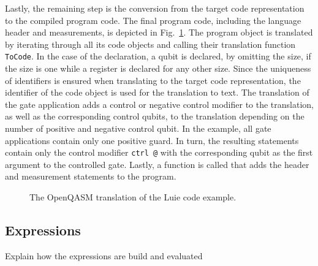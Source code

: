 Lastly, the remaining step is the conversion from the target code representation to the compiled program code. The final program code, including the language header and measurements, is depicted in Fig.~\ref{fig:codeGen_target_example}. The program object is translated by iterating through all its code objects and calling their translation function \texttt{ToCode}. In the case of the declaration, a qubit is declared, by omitting the size, if the size is one while a register is declared for any other size. Since the uniqueness of identifiers is ensured when translating to the target code representation, the identifier of the code object is used for the translation to text. The translation of the gate application adds a control or negative control modifier to the translation, as well as the corresponding control qubits, to the translation depending on the number of positive and negative control qubit. In the example, all gate applications contain only one positive guard. In turn, the resulting statements contain only the control modifier \texttt{ctrl @} with the corresponding qubit as the first argument to the controlled gate. Lastly, a function is called that adds the header and measurement statements to the program.  

\begin{figure}
    \centering
    
    \caption{The OpenQASM translation of the Luie code example.}
    \label{fig:codeGen_target_example}
\end{figure}


\subsection{Expressions}
\label{sec:implementation_expression}
Explain how the expressions are build and evaluated

